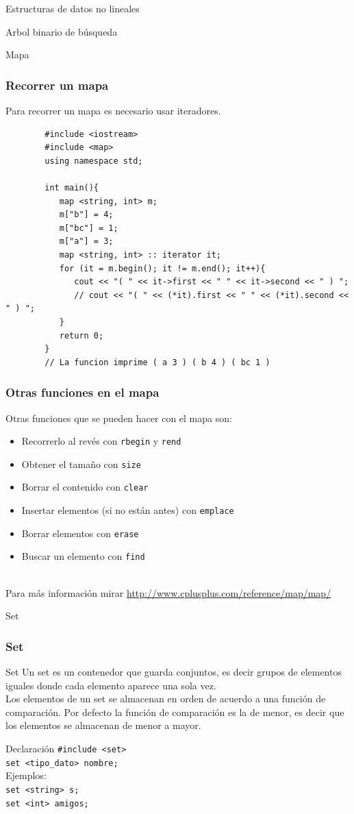 \documentclass{beamer}
\begin{document}
\begin{section}{Estructuras de datos no lineales}
\begin{subsection}{Arbol binario de búsqueda}
\begin{subsubsection}{Mapa}
	\begin{frame}[fragile]
		\frametitle{Recorrer un mapa}
		Para recorrer un mapa es necesario usar iteradores.\\
		\begin{lstlisting}
		#include <iostream>
		#include <map>
		using namespace std;

		int main(){
		   map <string, int> m;
		   m["b"] = 4;
		   m["bc"] = 1;
		   m["a"] = 3;
		   map <string, int> :: iterator it;
		   for (it = m.begin(); it != m.end(); it++){
		      cout << "( " << it->first << " " << it->second << " ) ";
		      // cout << "( " << (*it).first << " " << (*it).second << " ) ";
		   }
		   return 0;
		}
		// La funcion imprime ( a 3 ) ( b 4 ) ( bc 1 )
		\end{lstlisting}
	\end{frame}
	
	\begin{frame}[fragile]
		\frametitle{Otras funciones en el mapa}
		Otras funciones que se pueden hacer con el mapa son:\\
		\begin{itemize}
			\item Recorrerlo al revés con \verb|rbegin| y \verb|rend|
			\item Obtener el tamaño con \verb|size|
			\item Borrar el contenido con \verb|clear|
			\item Insertar elementos (si no están antes) con \verb|emplace|
			\item Borrar elementos con \verb|erase|
			\item Buscar un elemento con \verb|find|
		\end{itemize}
		\quad \\
		Para más información mirar \url{http://www.cplusplus.com/reference/map/map/}
	\end{frame}
\end{subsubsection}
\begin{subsubsection}{Set}
	\begin{frame}[fragile]
		\frametitle{Set}
		\begin{block}{Set}
			Un set es un contenedor que guarda conjuntos, es decir grupos de elementos iguales donde cada elemento aparece una sola vez.\\
			Los elementos de un set se almacenan en orden de acuerdo a una función de comparación. Por defecto la función de comparación es la de menor, es decir que los elementos se almacenan de menor a mayor.\\
		\end{block}
		\begin{block}{Declaración}
			\verb|#include <set>|\\
			\verb|set <tipo_dato> nombre;|\\
			Ejemplos:\\
			\verb|set <string> s;|\\
			\verb|set <int> amigos;|
		\end{block}
	\end{frame}


\end{subsubsection}
\end{subsection}
\end{section}
\end{document}
